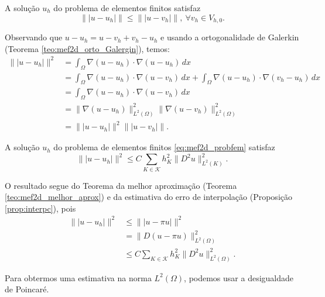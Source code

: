 \begin{teo}\label{teo:mef2d_melhor_aprox}
  A solução $u_h$ do problema de elementos finitos satisfaz
  \begin{equation}
    \||u-u_h|\| \leq \||u-v_h|\|,~\forall v_h\in V_{h,0}.
  \end{equation}
\end{teo}
\begin{dem}
  Observando que $u-u_h=u-v_h+v_h-u_h$ e usando a ortogonalidade de Galerkin (Teorema \ref{teo:mef2d_orto_Galergin}), temos:
  \begin{align}
    \||u-u_h|\|^2 &= \int_\Omega \nabla (u-u_h)\cdot\nabla (u-u_h)\,dx\\
    &= \int_{\Omega} \nabla (u-u_h)\cdot\nabla (u-v_h)\,dx + \int_{\Omega} \nabla (u-u_h)\cdot\nabla (v_h-u_h)\,dx\\
    &= \int_{\Omega} \nabla (u-u_h)\cdot\nabla (u-v_h)\,dx\\
    &= \|\nabla (u-u_h)\|_{L^2(\Omega)}^2\|\nabla (u-v_h)\|_{L^2(\Omega)}^2\\
    &= \||u-u_h|\|^2\||u-v_h|\|.
  \end{align}
\end{dem}

\begin{teo}\label{teo:mef2d_est_apriori_energia}
  A solução $u_h$ do problema de elementos finitos \eqref{eq:mef2d_probfem} satisfaz
  \begin{equation}
    \||u-u_h|\|^2 \leq C\sum_{K\in\mathcal{K}} h_K^2\|D^2u\|_{L^2(K)}^2.
  \end{equation}
\end{teo}
\begin{dem}
  O resultado segue do Teorema da melhor aproximação (Teorema \ref{teo:mef2d_melhor_aprox}) e da estimativa do erro de interpolação (Proposição \ref{prop:interpc}), pois
  \begin{align}
    \||u-u_h|\|^2 &\leq \||u-\pi u|\|^2\\
    &= \|D(u-\pi u)\|_{L^2(\Omega)}^2\\
    &\leq C\sum_{K\in\mathcal{K}} h_K^2\|D^2u\|_{L^2(\Omega)}^2.
  \end{align}
\end{dem}

Para obtermos uma estimativa na norma $L^2(\Omega)$, podemos usar a desigualdade de Poincaré.

